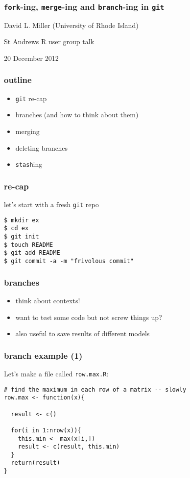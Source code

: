 \documentclass[ignorenonframetext,]{beamer}
\begin{document}
\begin{frame}\frametitle{\texttt{fork}-ing, \texttt{merge}-ing and
\texttt{branch}-ing in \texttt{git}}

David L. Miller (University of Rhode Island)

St Andrews R user group talk

20 December 2012

\end{frame}

\begin{frame}[fragile]\frametitle{outline}

\begin{itemize}[<+->]
\item
  \texttt{git} re-cap
\item
  branches (and how to think about them)
\item
  merging
\item
  deleting branches
\item
  \texttt{stash}ing
\end{itemize}

\end{frame}

\begin{frame}[fragile]\frametitle{re-cap}

let's start with a fresh \texttt{git} repo

\begin{verbatim}
$ mkdir ex
$ cd ex
$ git init
$ touch README
$ git add README
$ git commit -a -m "frivolous commit"
\end{verbatim}

\end{frame}

\begin{frame}\frametitle{branches}

\begin{itemize}[<+->]
\item
  think about contexts!
\item
  want to test some code but not screw things up?
\item
  also useful to save results of different models
\end{itemize}

\end{frame}

\begin{frame}[fragile]\frametitle{branch example (1)}

Let's make a file called \texttt{row.max.R}:

\begin{verbatim}
# find the maximum in each row of a matrix -- slowly
row.max <- function(x){

  result <- c()

  for(i in 1:nrow(x)){
    this.min <- max(x[i,])
    result <- c(result, this.min)
  }
  return(result)
}
\end{verbatim}

\end{frame}
\end{document}
